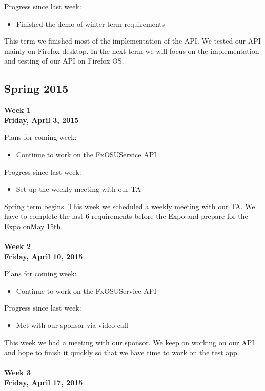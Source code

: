 \noindent Progress since last week:
\begin{itemize}
\item Finished the demo of winter term requirements
\end{itemize}

\noindent This term we finished most of the implementation of the API.  We tested our API mainly on Firefox desktop. In the next term we will focus on the implementation and testing of our API on Firefox OS.

\subsection{Spring 2015}
\textbf{Week 1\\Friday, April 3, 2015\\}

\noindent Plans for coming week:
\begin{itemize}
\item Continue to work on the FxOSUService API
\end{itemize}

\noindent Progress since last week:
\begin{itemize}
\item Set up the weekly meeting with our TA
\end{itemize}

\noindent Spring term begins. This week we scheduled a weekly meeting with our TA. We have to complete the last 6 requirements before the Expo and prepare for the Expo onMay 15th. \\
\\
\textbf{Week 2\\Friday, April 10, 2015\\}

\noindent Plans for coming week:
\begin{itemize}
\item Continue to work on the FxOSUService API
\end{itemize}

\noindent Progress since last week:
\begin{itemize}
\item Met with our sponsor via video call
\end{itemize}

\noindent This week we had a meeting with our sponsor. We keep on working on our API and hope to finish it quickly so that we have time to work on the test app. \\
\\
\textbf{Week 3\\Friday, April 17, 2015\\}

